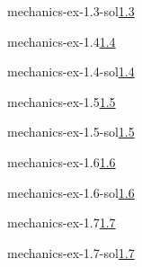 \documentclass[preview]{standalone}
\begin{document}
\begin{snippetsolution}{mechanics-ex-1.3-sol}{\underline{1.3}}
    \todo
\end{snippetsolution}

\begin{snippetexercise}{mechanics-ex-1.4}{\underline{1.4}}
    \todo
\end{snippetexercise}

\begin{snippetsolution}{mechanics-ex-1.4-sol}{\underline{1.4}}
    \todo
\end{snippetsolution}

\begin{snippetexercise}{mechanics-ex-1.5}{\underline{1.5}}
    \todo
\end{snippetexercise}

\begin{snippetsolution}{mechanics-ex-1.5-sol}{\underline{1.5}}
    \todo
\end{snippetsolution}

\begin{snippetexercise}{mechanics-ex-1.6}{\underline{1.6}}
    \todo
\end{snippetexercise}

\begin{snippetsolution}{mechanics-ex-1.6-sol}{\underline{1.6}}
    \todo
\end{snippetsolution}

\begin{snippetexercise}{mechanics-ex-1.7}{\underline{1.7}}
    \todo
\end{snippetexercise}

\begin{snippetsolution}{mechanics-ex-1.7-sol}{\underline{1.7}}
    \todo
\end{snippetsolution}
\end{document}
